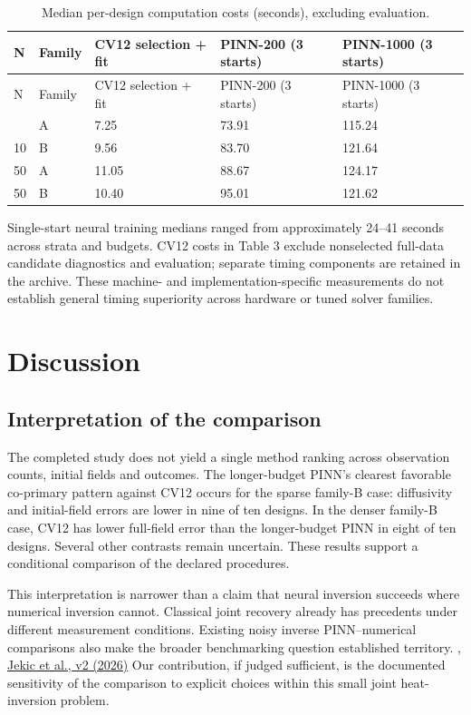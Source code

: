 \documentclass[10pt,a4paper]{article}
\begin{document}
\begingroup\small
\setlength{\tabcolsep}{3pt}
\begin{longtable}{@{}p{}p{}p{}p{}p{}@{}}
\caption{Median per-design computation costs (seconds), excluding evaluation.}\label{tab:3}\\
\toprule
N & Family & CV12 selection + fit & PINN-200 (3 starts) & PINN-1000 (3 starts) \\
\midrule\endfirsthead
\toprule
N & Family & CV12 selection + fit & PINN-200 (3 starts) & PINN-1000 (3 starts) \\
\midrule\endhead
\bottomrule\endfoot
10 & A & 7.25 & 73.91 & 115.24 \\
10 & B & 9.56 & 83.70 & 121.64 \\
50 & A & 11.05 & 88.67 & 124.17 \\
50 & B & 10.40 & 95.01 & 121.62 \\
\end{longtable}
\endgroup

Single-start neural training medians ranged from approximately 24–41 seconds
across strata and budgets. CV12 costs in Table 3 exclude nonselected full-data
candidate diagnostics and evaluation; separate timing components are retained
in the archive. These machine- and implementation-specific measurements do not
establish general timing superiority across hardware or tuned solver families.

\section{Discussion}

\subsection{Interpretation of the comparison}

The completed study does not yield a single method ranking across observation
counts, initial fields and outcomes. The longer-budget PINN's clearest favorable
co-primary pattern against CV12 occurs for the sparse family-B case: diffusivity
and initial-field errors are lower in nine of ten designs. In the denser
family-B case, CV12 has lower full-field error than the longer-budget PINN in
eight of ten designs. Several other contrasts remain uncertain. These results
support a conditional comparison of the declared procedures.

This interpretation is narrower than a claim that neural inversion succeeds
where numerical inversion cannot. Classical joint recovery already has
precedents under different measurement conditions.
\cite{zhao2017}
Existing noisy inverse PINN–numerical comparisons also make the broader
benchmarking question established territory.
\cite{zapf2022},
\href{https://arxiv.org/html/2509.20191v2}{Jekic et al., v2 (2026)}
Our contribution, if judged sufficient, is the documented sensitivity of the
comparison to explicit choices within this small joint heat-inversion problem.
\end{document}
